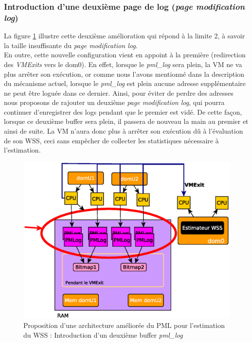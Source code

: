 \subsubsection{Introduction d'une deuxième page de log (\textit{page modification log})}

La figure \ref{fig:double_log} illustre cette deuxième amélioration qui répond à la limite 2, à savoir la taille insuffisante du \textit{page modification log}.\\
En outre, cette nouvelle configuration vient en appoint à la première (redirection des \textit{VMExits} vers le dom0). En effet, lorsque le \textit{pml\_log} sera plein, la VM ne va plus arrêter son exécution, or comme nous l'avons mentionné dans la description du mécanisme actuel, lorsque le \textit{pml\_log} est plein aucune adresse supplémentaire ne peut être loguée dans ce dernier. Ainsi, pour éviter de perdre des adresses nous proposons de rajouter un deuxième \textit{page modification log}, qui pourra continuer d'enregistrer des logs pendant que le premier est vidé. De cette façon, lorsque ce deuxième buffer sera plein, il passera de nouveau la main au premier et ainsi de suite. La VM n'aura donc plus à arrêter son exécution dû à l'évaluation de son WSS, ceci sans empêcher de collecter les statistiques nécessaire à l'estimation.

\begin{figure}[H]
    \centering
    \includegraphics[scale=.8]{chapters/3/fig3/PMLOverview2}
    \caption{Proposition d'une architecture améliorée du PML pour l'estimation du WSS : Introduction d'un deuxième buffer \textit{pml\_log}}
    \label{fig:double_log}
\end{figure}

